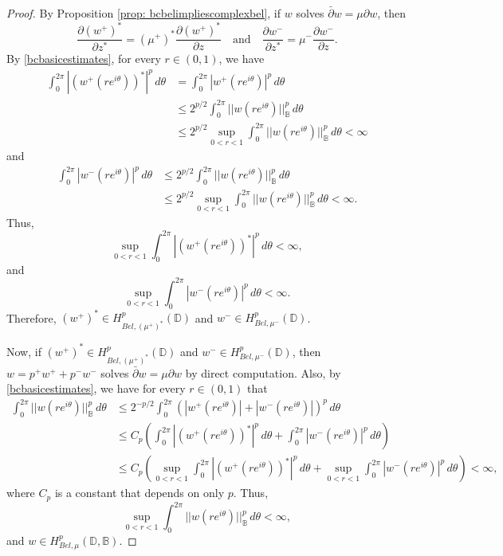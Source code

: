 \documentclass[12pt,reqno]{amsart}
\theoremstyle{definition}
\theoremstyle{remark}
\newcommand{\p}{\partial}
\newcommand{\dbar}{\bar\partial}
\newcommand{\bc}{\mathbb{B}}
\newcommand{\disk}{\mathbb{D}}
\begin{document}
\begin{proof}
    By Proposition \ref{prop: bcbelimpliescomplexbel}, if $w$ solves $\dbar w = \mu \p w$, then 
    \[
        \frac{\p (w^+)^*}{\p z^*} = (\mu^+)^* \frac{\p (w^+)^*}{\p z}
    \quad \text{and} \quad
        \frac{\p w^-}{\p z^*} = \mu^- \frac{\p w^-}{\p z}.
    \]
    By \eqref{bcbasicestimates}, for every $r \in (0,1)$, we have 
    \begin{align*}
    \int_0^{2\pi} |(w^+(re^{i\theta}))^*|^p \,d\theta &= 
        \int_0^{2\pi} |w^+(re^{i\theta})|^p \,d\theta \\
        &\leq 2^{p/2}\int_0^{2\pi} ||w(re^{i\theta})||_\bc^p \,d\theta \\
        &\leq 2^{p/2} \sup_{0 < r< 1} \int_0^{2\pi} ||w(re^{i\theta})||_\bc^p \,d\theta< \infty
    \end{align*}
    and 
    \begin{align*}
         \int_0^{2\pi} |w^-(re^{i\theta})|^p \,d\theta 
         &\leq 2^{p/2}\int_0^{2\pi} ||w(re^{i\theta})||_\bc^p \,d\theta \\
         &\leq 2^{p/2}\sup_{0 < r < 1}\int_0^{2\pi} ||w(re^{i\theta})||_\bc^p \,d\theta < \infty.
    \end{align*}
    Thus, 
    \[
        \sup_{0 < r < 1}  \int_0^{2\pi} |(w^+(re^{i\theta}))^*|^p \,d\theta < \infty,
    \]
    and
    \[
        \sup_{0 < r < 1}\int_0^{2\pi} |w^-(re^{i\theta})|^p \,d\theta < \infty.
    \]
    Therefore, $(w^+)^* \in H^p_{Bel, (\mu^+)^*}(\disk)$ and $w^- \in H^p_{Bel,\mu^-}(\disk)$.

    Now, if $(w^+)^* \in H^p_{Bel, (\mu^+)^*}(\disk)$ and $w^- \in H^p_{Bel,\mu^-}(\disk)$, then $w = p^+ w^+ + p^- w^-$ solves $\dbar w = \mu \p w$ by direct computation. Also, by \eqref{bcbasicestimates}, we have for every $r \in (0,1)$ that 
    \begin{align*}
        \int_0^{2\pi} ||w(re^{i\theta})||_\bc^p \,d\theta 
        &\leq 2^{-p/2} \int_0^{2\pi} (|w^+(re^{i\theta})|+|w^-(re^{i\theta})|)^p\,d\theta \\
        &\leq C_p \left( \int_0^{2\pi} |(w^+(re^{i\theta}))^*|^p \,d\theta + \int_0^{2\pi} |w^-(re^{i\theta})|^p\,d\theta\right) \\
        &\leq C_p \left( \sup_{0 < r < 1}\int_0^{2\pi} |(w^+(re^{i\theta}))^*|^p \,d\theta + \sup_{0 < r < 1}\int_0^{2\pi} |w^-(re^{i\theta})|^p\,d\theta\right) < \infty,
    \end{align*}
    where $C_p$ is a constant that depends on only $p$. Thus, 
    \[
        \sup_{0 < r < 1}\int_0^{2\pi} ||w(re^{i\theta})||_\bc^p \,d\theta < \infty,
    \]
    and $w \in H^p_{Bel,\mu}(\disk,\bc)$. 

\end{proof}
\end{document}
